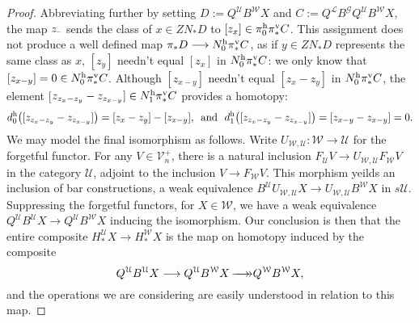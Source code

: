 \documentclass[11pt]{amsart}
\theoremstyle{plain}
\theoremstyle{definition}
\newcommand{\DASH}{\textup{--}}
\renewcommand{\to}{\longrightarrow}
\newcommand{\scrG}{\mathscr{G}}
\newcommand{\calW}{\mathcal{W}}
\newcommand{\calU}{\mathcal{U}}
\newcommand{\calL}{\mathcal{L}}
\newcommand{\calV}{\mathcal{V}}
\theoremstyle{plain}
\newcommand{\vect}[2]{\calV^{#1}_{#2}}
\newcommand{\BSW}{{\scrG}}
\newcommand{\epi}{{\,\makebox[0cm][l]{\ensuremath\to}\to}}
\begin{document}
\begin{Composite functor spectral sequences}
\begin{proof}
Abbreviating further by setting $D:=Q^{\calU}B^{\calW}X$ and $C:=Q^{\calL}B^{\BSW} Q^{\calU}B^{\calW}X$, the map $z_{\DASH}$ sends the class of $x\in ZN_*D$ to $[z_x]\in \pi_0^\textup{h}\pi^\textup{v}_*C$. This assignment does not produce a well defined map $\pi_*D\to N^\textup{h}_0\pi^\textup{v}_*C$, as if $y\in ZN_* D$ represents the same class as $x$, $[z_y]$ needn't equal $[z_x]$ in $N^\textup{h}_0\pi^\textup{v}_*C$: we only know that $[z_{x-y}]=0\in N_0^\textup{h}\pi_*^\textup{v}C$.
Although $[z_{x-y}]$ needn't equal $[z_{x}-z_{y}]$ in $N_0^\textup{h}\pi_*^\textup{v}C$, the element [$z_{z_{x}-z_{y}}-z_{z_{x-y}}]\in N_1^\textup{h}\pi_*^\textup{v}C$ provides a homotopy:
%
\[d_0^\textup{h}\!\left([z_{z_{x}-z_{y}}-z_{z_{x-y}}]\right)=[z_x-z_y]-[z_{x-y}]\textup{, \  and \ }d_1^\textup{h}\!\left([z_{z_{x}-z_{y}}-z_{z_{x-y}}]\right)=[z_{{x}-{y}}-z_{{x}-{y}}]=0.\]
We may model the final isomorphism as follows. Write $U_{\calW,\calU}:\calW\to\calU$ for the forgetful functor. For any $V\in\vect{+}{n}$, there is a natural inclusion $F_{\calU}V\to U_{\calW,\calU} F_{\calW}V$ in the category  $\calU$, adjoint to the inclusion $V\to F_{\calW}V$. This morphism yeilds an inclusion of bar constructions, a weak equivalence $B^{\calU}U_{\calW,\calU}X\to U_{\calW,\calU}B^{\calW}X$ in $s\calU$. Suppressing the forgetful functors, for $X\in\calW$, we have a weak equivalence $Q^{\calU}B^{\calU}X\to Q^{\calU}B^{\calW}X$ inducing the isomorphism. Our conclusion is then that the entire composite $H_*^{\calU}X\to H_*^{\calW}X$ is the map on homotopy induced by the composite 
\[Q^{\calU}B^{\calU}X\to Q^{\calU}B^{\calW}X \epi Q^{\calW}B^{\calW}X,\]
and the operations we are considering are easily understood in relation to this map.
\end{proof}


\end{Composite functor spectral sequences}
\end{document}
